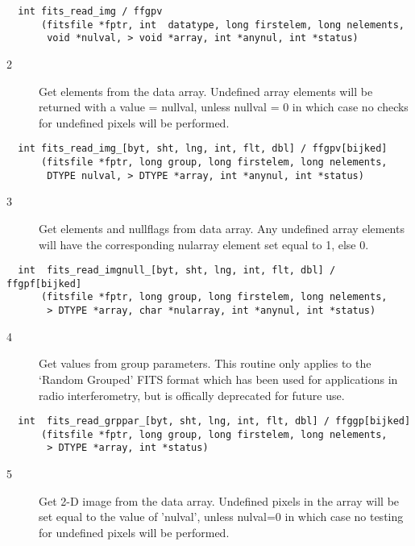 \begin{verbatim}
  int fits_read_img / ffgpv
      (fitsfile *fptr, int  datatype, long firstelem, long nelements,
       void *nulval, > void *array, int *anynul, int *status)
\end{verbatim}

\begin{description}
\item[2 ] Get elements from the data array.  Undefined array elements will be
    returned with a value = nullval, unless nullval = 0 in which case no
   checks for undefined pixels will be performed.
\end{description}

\begin{verbatim}
  int fits_read_img_[byt, sht, lng, int, flt, dbl] / ffgpv[bijked]
      (fitsfile *fptr, long group, long firstelem, long nelements,
       DTYPE nulval, > DTYPE *array, int *anynul, int *status)
\end{verbatim}

\begin{description}
\item[3 ] Get elements and nullflags from data array.
    Any undefined array elements will have the corresponding nularray element
   set equal to 1, else 0.
\end{description}

\begin{verbatim}
  int  fits_read_imgnull_[byt, sht, lng, int, flt, dbl] / ffgpf[bijked]
      (fitsfile *fptr, long group, long firstelem, long nelements,
       > DTYPE *array, char *nularray, int *anynul, int *status)
\end{verbatim}

\begin{description}
\item[4 ] Get values from group parameters.  This routine only applies
    to the `Random Grouped' FITS format which has been used for
    applications in radio interferometry, but is offically deprecated
   for future use.
\end{description}

\begin{verbatim}
  int  fits_read_grppar_[byt, sht, lng, int, flt, dbl] / ffggp[bijked]
      (fitsfile *fptr, long group, long firstelem, long nelements,
       > DTYPE *array, int *status)
\end{verbatim}

\begin{description}
\item[5 ]  Get 2-D image from the data array.  Undefined
     pixels in the array will be set equal to the value of 'nulval',
     unless nulval=0 in which case no testing for undefined pixels will
    be performed.
\end{description}

